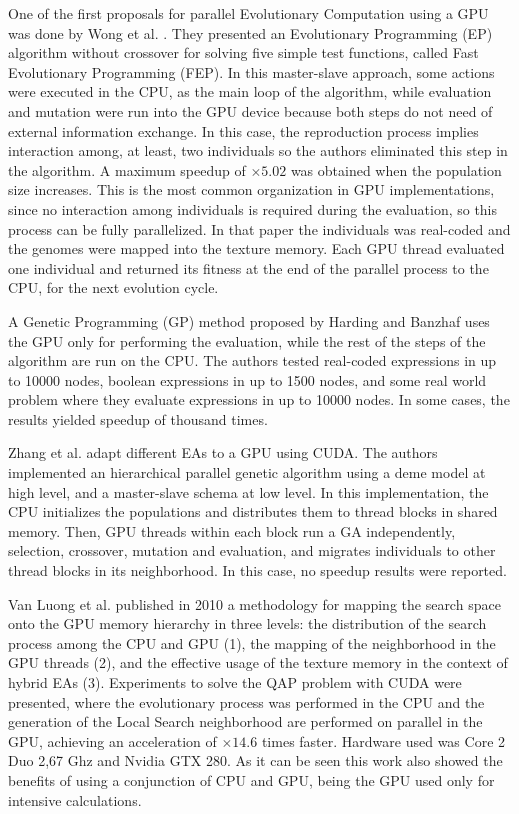 \documentclass[Afour,sageh,times]{sagej}
\begin{document}
One of the first proposals for parallel Evolutionary Computation using a GPU was done by Wong et al. \citep{man-leung-wong-parallel-2005}. They presented an Evolutionary Programming (EP) algorithm without crossover for solving five simple test functions, called Fast Evolutionary Programming (FEP). In this master-slave approach, some actions were executed in the CPU, as the main loop of the algorithm, while evaluation and mutation were run into the GPU device because both steps do not need of external information exchange. In this case, the reproduction process implies interaction among, at least, two individuals so the authors eliminated this step in the algorithm. A maximum speedup of $\times5.02$ was obtained when the population size increases. This is the most common organization in GPU implementations, since no interaction among individuals is required during the evaluation, so this process can be fully parallelized. In that paper the individuals was real-coded and the genomes were mapped into the texture memory. Each GPU thread evaluated one individual and returned its fitness at the end of the parallel process to the CPU, for the next evolution cycle.

A Genetic Programming (GP) method proposed by Harding and Banzhaf \citep{4215552} uses the GPU only for performing the evaluation, while the rest of the steps of the algorithm are run on the CPU. The authors tested real-coded expressions in up to 10000 nodes, boolean expressions in up to 1500 nodes, and some real world problem where they evaluate expressions in up to 10000 nodes. In some cases, the results yielded speedup of thousand times.

Zhang et al. \citep{ZhangImplementationMasterSlave} adapt different EAs to a GPU using CUDA. The authors implemented an hierarchical parallel genetic algorithm using a deme model at high level, and a master-slave schema at low level. In this implementation, the CPU initializes the populations and distributes them to thread blocks in shared memory. Then, GPU threads within each block run a GA independently, selection, crossover, mutation and evaluation, and migrates individuals to other thread blocks in its neighborhood. In this case, no speedup results were reported.

Van Luong et al. \citep{5586403} published in 2010 a methodology for mapping the search space onto the GPU memory hierarchy in three levels: the distribution of the search process among the CPU and GPU (1), the mapping of the neighborhood in the GPU threads (2), and the effective usage of the texture memory in the context of hybrid EAs (3). Experiments to solve the QAP problem with CUDA were presented, where the evolutionary process was performed in the CPU and the generation of the Local Search neighborhood are performed on parallel in the GPU, achieving an acceleration of $\times14.6$ times faster. Hardware used was Core 2 Duo 2,67 Ghz and Nvidia GTX 280. As it can be seen this work also showed the benefits of using a conjunction of CPU and GPU, being the GPU used only for intensive calculations.
\end{document}
